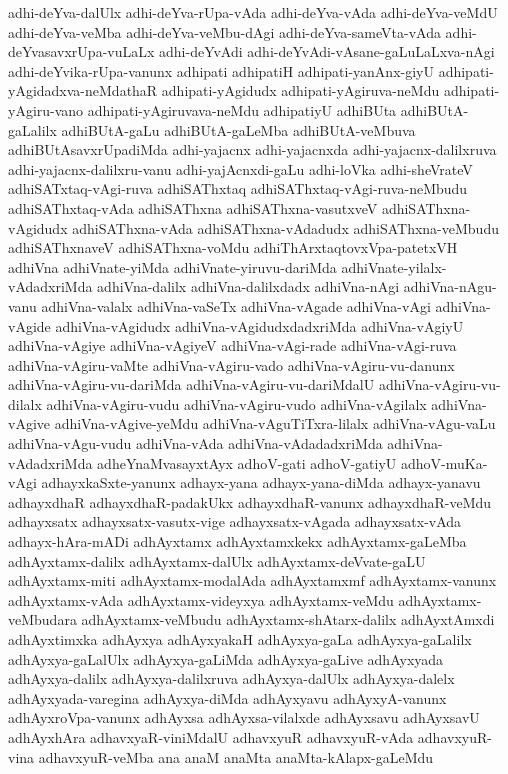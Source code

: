 {adhi-deYva-dalUlx
adhi-deYva-rUpa-vAda
adhi-deYva-vAda
adhi-deYva-veMdU
adhi-deYva-veMba
adhi-deYva-veMbu-dAgi
adhi-deYva-sameVta-vAda
adhi-deYvasavxrUpa-vuLaLx
adhi-deYvAdi
adhi-deYvAdi-vAsane-gaLuLaLxva-nAgi
adhi-deYvika-rUpa-vanunx
adhipati
adhipatiH
adhipati-yanAnx-giyU
adhipati-yAgidadxva-neMdathaR
adhipati-yAgidudx
adhipati-yAgiruva-neMdu
adhipati-yAgiru-vano
adhipati-yAgiruvava-neMdu
adhipatiyU
adhiBUta
adhiBUtA-gaLalilx
adhiBUtA-gaLu
adhiBUtA-gaLeMba
adhiBUtA-veMbuva
adhiBUtAsavxrUpadiMda
adhi-yajacnx
adhi-yajacnxda
adhi-yajacnx-dalilxruva
adhi-yajacnx-dalilxru-vanu
adhi-yajAcnxdi-gaLu
adhi-loVka
adhi-sheVrateV
adhiSATxtaq-vAgi-ruva
adhiSAThxtaq
adhiSAThxtaq-vAgi-ruva-neMbudu
adhiSAThxtaq-vAda
adhiSAThxna
adhiSAThxna-vasutxveV
adhiSAThxna-vAgidudx
adhiSAThxna-vAda
adhiSAThxna-vAdadudx
adhiSAThxna-veMbudu
adhiSAThxnaveV
adhiSAThxna-voMdu
adhiThArxtaqtovxVpa-patetxVH
adhiVna
adhiVnate-yiMda
adhiVnate-yiruvu-dariMda
adhiVnate-yilalx-vAdadxriMda
adhiVna-dalilx
adhiVna-dalilxdadx
adhiVna-nAgi
adhiVna-nAgu-vanu
adhiVna-valalx
adhiVna-vaSeTx
adhiVna-vAgade
adhiVna-vAgi
adhiVna-vAgide
adhiVna-vAgidudx
adhiVna-vAgidudxdadxriMda
adhiVna-vAgiyU
adhiVna-vAgiye
adhiVna-vAgiyeV
adhiVna-vAgi-rade
adhiVna-vAgi-ruva
adhiVna-vAgiru-vaMte
adhiVna-vAgiru-vado
adhiVna-vAgiru-vu-danunx
adhiVna-vAgiru-vu-dariMda
adhiVna-vAgiru-vu-dariMdalU
adhiVna-vAgiru-vu-dilalx
adhiVna-vAgiru-vudu
adhiVna-vAgiru-vudo
adhiVna-vAgilalx
adhiVna-vAgive
adhiVna-vAgive-yeMdu
adhiVna-vAguTiTxra-lilalx
adhiVna-vAgu-vaLu
adhiVna-vAgu-vudu
adhiVna-vAda
adhiVna-vAdadadxriMda
adhiVna-vAdadxriMda
adheYnaMvasayxtAyx
adhoV-gati
adhoV-gatiyU
adhoV-muKa-vAgi
adhayxkaSxte-yanunx
adhayx-yana
adhayx-yana-diMda
adhayx-yanavu
adhayxdhaR
adhayxdhaR-padakUkx
adhayxdhaR-vanunx
adhayxdhaR-veMdu
adhayxsatx
adhayxsatx-vasutx-vige
adhayxsatx-vAgada
adhayxsatx-vAda
adhayx-hAra-mADi
adhAyxtamx
adhAyxtamxkekx
adhAyxtamx-gaLeMba
adhAyxtamx-dalilx
adhAyxtamx-dalUlx
adhAyxtamx-deVvate-gaLU
adhAyxtamx-miti
adhAyxtamx-modalAda
adhAyxtamxmf
adhAyxtamx-vanunx
adhAyxtamx-vAda
adhAyxtamx-videyxya
adhAyxtamx-veMdu
adhAyxtamx-veMbudara
adhAyxtamx-veMbudu
adhAyxtamx-shAtarx-dalilx
adhAyxtAmxdi
adhAyxtimxka
adhAyxya
adhAyxyakaH
adhAyxya-gaLa
adhAyxya-gaLalilx
adhAyxya-gaLalUlx
adhAyxya-gaLiMda
adhAyxya-gaLive
adhAyxyada
adhAyxya-dalilx
adhAyxya-dalilxruva
adhAyxya-dalUlx
adhAyxya-dalelx
adhAyxyada-varegina
adhAyxya-diMda
adhAyxyavu
adhAyxyA-vanunx
adhAyxroVpa-vanunx
adhAyxsa
adhAyxsa-vilalxde
adhAyxsavu
adhAyxsavU
adhAyxhAra
adhavxyaR-viniMdalU
adhavxyuR
adhavxyuR-vAda
adhavxyuR-vina
adhavxyuR-veMba
ana
anaM
anaMta
anaMta-kAlapx-gaLeMdu
}
